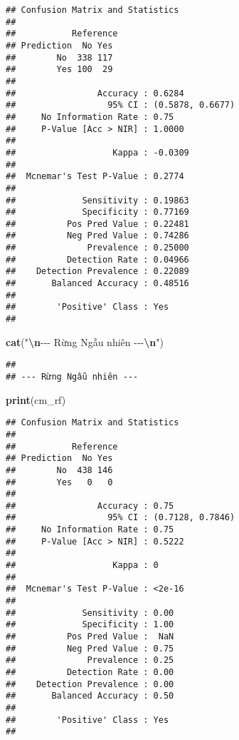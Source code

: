 \documentclass[
]{article}
\newenvironment{Shaded}{\begin{snugshade}}{\end{snugshade}}
\newcommand{\FunctionTok}[1]{\textcolor[rgb]{0.13,0.29,0.53}{\textbf{#1}}}
\newcommand{\NormalTok}[1]{#1}
\newcommand{\SpecialCharTok}[1]{\textcolor[rgb]{0.81,0.36,0.00}{\textbf{#1}}}
\newcommand{\StringTok}[1]{\textcolor[rgb]{0.31,0.60,0.02}{#1}}
\begin{document}
\begin{verbatim}
## Confusion Matrix and Statistics
## 
##           Reference
## Prediction  No Yes
##        No  338 117
##        Yes 100  29
##                                           
##                Accuracy : 0.6284          
##                  95% CI : (0.5878, 0.6677)
##     No Information Rate : 0.75            
##     P-Value [Acc > NIR] : 1.0000          
##                                           
##                   Kappa : -0.0309         
##                                           
##  Mcnemar's Test P-Value : 0.2774          
##                                           
##             Sensitivity : 0.19863         
##             Specificity : 0.77169         
##          Pos Pred Value : 0.22481         
##          Neg Pred Value : 0.74286         
##              Prevalence : 0.25000         
##          Detection Rate : 0.04966         
##    Detection Prevalence : 0.22089         
##       Balanced Accuracy : 0.48516         
##                                           
##        'Positive' Class : Yes             
## 
\end{verbatim}

\begin{Shaded}
\begin{Highlighting}[]
\FunctionTok{cat}\NormalTok{(}\StringTok{"}\SpecialCharTok{\textbackslash{}n}\StringTok{{-}{-}{-} Rừng Ngẫu nhiên {-}{-}{-}}\SpecialCharTok{\textbackslash{}n}\StringTok{"}\NormalTok{)}
\end{Highlighting}
\end{Shaded}

\begin{verbatim}
## 
## --- Rừng Ngẫu nhiên ---
\end{verbatim}

\begin{Shaded}
\begin{Highlighting}[]
\FunctionTok{print}\NormalTok{(cm\_rf)}
\end{Highlighting}
\end{Shaded}

\begin{verbatim}
## Confusion Matrix and Statistics
## 
##           Reference
## Prediction  No Yes
##        No  438 146
##        Yes   0   0
##                                           
##                Accuracy : 0.75            
##                  95% CI : (0.7128, 0.7846)
##     No Information Rate : 0.75            
##     P-Value [Acc > NIR] : 0.5222          
##                                           
##                   Kappa : 0               
##                                           
##  Mcnemar's Test P-Value : <2e-16          
##                                           
##             Sensitivity : 0.00            
##             Specificity : 1.00            
##          Pos Pred Value :  NaN            
##          Neg Pred Value : 0.75            
##              Prevalence : 0.25            
##          Detection Rate : 0.00            
##    Detection Prevalence : 0.00            
##       Balanced Accuracy : 0.50            
##                                           
##        'Positive' Class : Yes             
## 
\end{verbatim}
\end{document}
